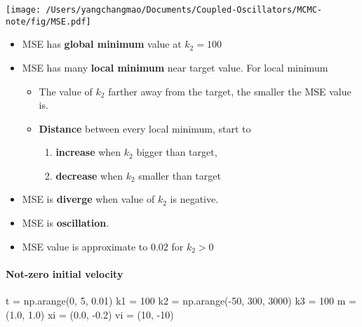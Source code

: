 \documentclass[
]{article}
\newenvironment{Shaded}{}{}
\newcommand{\DecValTok}[1]{\textcolor[rgb]{0.25,0.63,0.44}{#1}}
\newcommand{\FloatTok}[1]{\textcolor[rgb]{0.25,0.63,0.44}{#1}}
\newcommand{\NormalTok}[1]{#1}
\newcommand{\OperatorTok}[1]{\textcolor[rgb]{0.40,0.40,0.40}{#1}}
\begin{document}
\texttt{[image: /Users/yangchangmao/Documents/Coupled-Oscillators/MCMC-note/fig/MSE.pdf]}

\begin{itemize}
\item
  MSE has \textbf{global minimum} value at \(k_2 = 100\)
\item
  MSE has many \textbf{local minimum} near target value. For local
  minimum

  \begin{itemize}
  \item
    The value of \(k_2\) farther away from the target, the smaller the
    MSE value is.
  \item
    \textbf{Distance} between every local minimum, start to

    \begin{enumerate}
    \def\labelenumi{\arabic{enumi}.}
    \item
      \textbf{increase} when \(k_2\) bigger than target,
    \item
      \textbf{decrease} when \(k_2\) smaller than target
    \end{enumerate}
  \end{itemize}
\item
  MSE is \textbf{diverge} when value of \(k_2\) is negative.
\item
  MSE is \textbf{oscillation}.
\item
  MSE value is approximate to \(0.02\) for \(k_2>0\)
\end{itemize}

\hypertarget{not-zero-initial-velocity}{%
\paragraph{\texorpdfstring{Not-zero initial velocity
}{Not-zero initial velocity }}\label{not-zero-initial-velocity}}

\begin{Shaded}
\begin{Highlighting}[]
\NormalTok{t  }\OperatorTok{=}\NormalTok{ np.arange(}\DecValTok{0}\NormalTok{, }\DecValTok{5}\NormalTok{, }\FloatTok{0.01}\NormalTok{)}
\NormalTok{k1 }\OperatorTok{=} \DecValTok{100}
\NormalTok{k2 }\OperatorTok{=}\NormalTok{ np.arange(}\OperatorTok{{-}}\DecValTok{50}\NormalTok{, }\DecValTok{300}\NormalTok{, }\DecValTok{3000}\NormalTok{)}
\NormalTok{k3 }\OperatorTok{=} \DecValTok{100}
\NormalTok{m  }\OperatorTok{=}\NormalTok{ (}\FloatTok{1.0}\NormalTok{, }\FloatTok{1.0}\NormalTok{)}
\NormalTok{xi }\OperatorTok{=}\NormalTok{ (}\FloatTok{0.0}\NormalTok{, }\OperatorTok{{-}}\FloatTok{0.2}\NormalTok{)}
\NormalTok{vi }\OperatorTok{=}\NormalTok{ (}\DecValTok{10}\NormalTok{, }\OperatorTok{{-}}\DecValTok{10}\NormalTok{)}
\end{Highlighting}
\end{Shaded}
\end{document}
